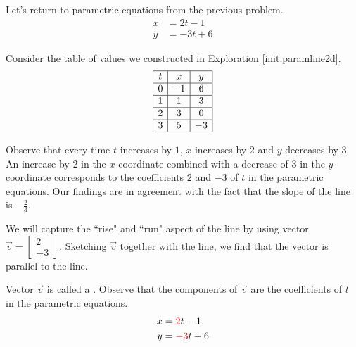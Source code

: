 \documentclass{ximera}
\begin{document}
 
\begin{exploration}\label{init:paramline2dpart3}
Let's return to parametric equations from the previous problem.
\begin{align*}
x&=2t-1\\
y&=-3t+6
\end{align*}
 
Consider the table of values we constructed in Exploration \ref{init:paramline2d}.
$$\begin{array}{|c|c|c|} 
 \hline t& x & y\\
 \hline 0 & -1 & 6\\
 \hline 1 & 1 & 3 \\
 \hline 2 & 3& 0\\
 \hline 3 & 5& -3\\
 \hline
 \end{array}$$
 
Observe that every time $t$ increases by $1$, $x$ increases by $2$ and $y$ decreases by $3$.  An increase by $2$ in the $x$-coordinate combined with a decrease of $3$ in the $y$-coordinate corresponds to the coefficients $2$ and $-3$ of $t$ in the parametric equations.  Our findings are in agreement with the fact that the slope of the line is $-\frac{2}{3}$. 
 
We will capture the ``rise" and ``run" aspect of the line by using vector $\vec{v}=\begin{bmatrix}2\\-3\end{bmatrix}$. Sketching $\vec{v}$ together with the line, we find that the vector is parallel to the line. 
 
 \begin{center}
\end{center}
 
Vector $\vec{v}$ is called a .  Observe that the components of $\vec{v}$ are the coefficients of $t$ in the parametric equations.
\begin{align*}
x&={\color{red}2}t-1\\
y&={\color{red}-3}t+6
\end{align*}
 

\end{exploration}
\end{document}
